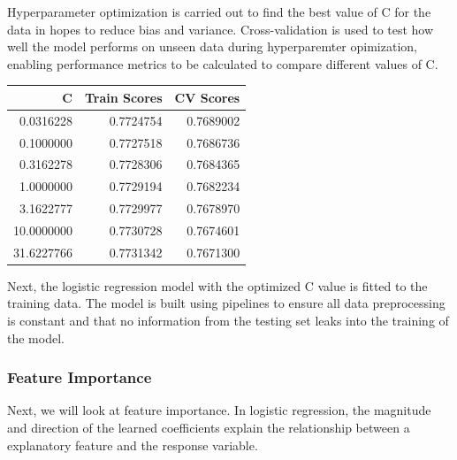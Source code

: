 \documentclass[
]{article}
\begin{document}
Hyperparameter optimization is carried out to find the best value of C
for the data in hopes to reduce bias and variance. Cross-validation is
used to test how well the model performs on unseen data during
hyperparemter opimization, enabling performance metrics to be calculated
to compare different values of C.

\begin{longtable}[]{@{}rrr@{}}
\toprule
C & Train Scores & CV Scores \\
\midrule
\endhead
0.0316228 & 0.7724754 & 0.7689002 \\
0.1000000 & 0.7727518 & 0.7686736 \\
0.3162278 & 0.7728306 & 0.7684365 \\
1.0000000 & 0.7729194 & 0.7682234 \\
3.1622777 & 0.7729977 & 0.7678970 \\
10.0000000 & 0.7730728 & 0.7674601 \\
31.6227766 & 0.7731342 & 0.7671300 \\
\bottomrule
\end{longtable}

Next, the logistic regression model with the optimized C value is fitted
to the training data. The model is built using pipelines to ensure all
data preprocessing is constant and that no information from the testing
set leaks into the training of the model.

\hypertarget{feature-importance}{%
\subsubsection{Feature Importance}\label{feature-importance}}

Next, we will look at feature importance. In logistic regression, the
magnitude and direction of the learned coefficients explain the
relationship between a explanatory feature and the response variable.
\end{document}
